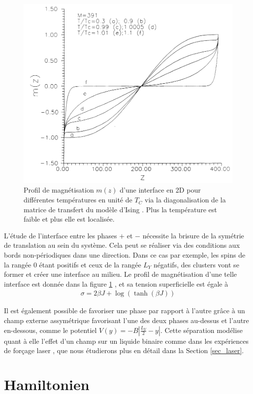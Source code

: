 \begin{figure}
    \centering
    \includegraphics[width=0.5\linewidth]{isingtosos/stecki-profil.png}
    \caption{Profil de magnétisation $m(z)$ d'une interface en 2D pour différentes températures en unité de $T_C$ via la diagonalisation de la matrice de transfert du modèle d'Ising \cite{stecki_magnetization_1994}. Plus la température est faible  et plus elle est localisée.}
    \label{interface-ising}
\end{figure}

L'étude de l'interface entre les phases $+$ et $-$ nécessite la brisure de la symétrie de translation au sein du système. Cela peut se réaliser via des conditions aux bords non-périodiques dans une direction.
Dans ce cas par exemple, les spins de la rangée $0$ étant positifs et ceux de la rangée $L_Y$ négatifs, des clusters vont se former et créer une interface au milieu. 
Le profil de magnétisation d'une telle interface est donnée dans la figure \ref{interface-ising} \cite{stecki_magnetization_1994}, et sa tension superficielle est égale à \cite{abraham_transfer_1973,abraham_interface_1976,richards_numerical_1993} 
\begin{align}
    \sigma = 2 \beta J + \log(\tanh(\beta J))
\end{align}

Il est également possible de favoriser une phase par rapport à l'autre grâce à un champ externe assymétrique favorisant l'une des deux phases au-dessus et l'autre en-dessous, comme le potentiel $V(y) = - B |\frac{L_Y}{2}-y|$. Cette séparation modélise quant à elle l'effet d'un champ  sur un liquide binaire comme dans les expériences de forçage laser \cite{girot_conical_2019}, que nous étudierons plus en détail dans la Section \ref{sec_laser}.

    \section{Hamiltonien}
	
